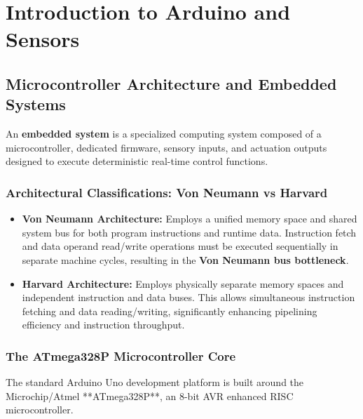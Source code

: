\chapter{Introduction to Arduino and Sensors}
\label{chap:arduino-sensors}

\section{Microcontroller Architecture and Embedded Systems}
An \textbf{embedded system} is a specialized computing system composed of a microcontroller, dedicated firmware, sensory inputs, and actuation outputs designed to execute deterministic real-time control functions.

\subsection{Architectural Classifications: Von Neumann vs Harvard}
\begin{itemize}
    \item \textbf{Von Neumann Architecture:} Employs a unified memory space and shared system bus for both program instructions and runtime data. Instruction fetch and data operand read/write operations must be executed sequentially in separate machine cycles, resulting in the \textbf{Von Neumann bus bottleneck}.
    \item \textbf{Harvard Architecture:} Employs physically separate memory spaces and independent instruction and data buses. This allows simultaneous instruction fetching and data reading/writing, significantly enhancing pipelining efficiency and instruction throughput.
\end{itemize}

\subsection{The ATmega328P Microcontroller Core}
The standard Arduino Uno development platform is built around the Microchip/Atmel **ATmega328P**, an 8-bit AVR enhanced RISC microcontroller.

